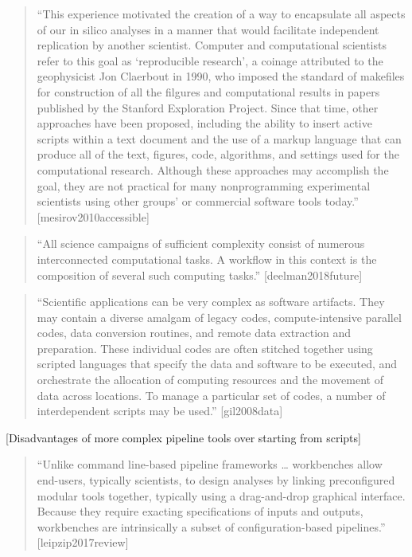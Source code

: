 \documentclass[]{tufte-book}
\begin{document}
\begin{quote}
``This experience motivated the creation of a way to encapsulate all aspects of
our in silico analyses in a manner that would facilitate independent replication
by another scientist. Computer and computational scientists refer to this goal as
`reproducible research', a coinage attributed to the geophysicist Jon Claerbout in 1990,
who imposed the standard of makefiles for construction of all the filgures and computational
results in papers published by the Stanford Exploration Project. Since that time, other
approaches have been proposed, including the ability to insert active scripts
within a text document and the use of a markup language that can produce
all of the text, figures, code, algorithms, and settings used for the computational
research. Although these approaches may accomplish the goal, they are not practical
for many nonprogramming experimental scientists using other groups' or commercial
software tools today.'' {[}mesirov2010accessible{]}
\end{quote}

\begin{quote}
``All science campaigns of sufficient complexity consist of numerous interconnected computational
tasks. A workflow in this context is the composition of several such computing
tasks.'' {[}deelman2018future{]}
\end{quote}

\begin{quote}
``Scientific applications can be very complex as software artifacts. They may contain
a diverse amalgam of legacy codes, compute-intensive parallel codes, data conversion routines, and remote
data extraction and preparation. These individual codes are often stitched
together using scripted languages that specify the data and software to be
executed, and orchestrate the allocation of computing resources and the
movement of data across locations. To manage a particular set of codes, a number
of interdependent scripts may be used.'' {[}gil2008data{]}
\end{quote}

{[}Disadvantages of more complex pipeline tools over starting from scripts{]}

\begin{quote}
``Unlike command line-based pipeline frameworks \ldots{} workbenches allow
end-users, typically scientists, to design analyses by linking preconfigured
modular tools together, typically using a drag-and-drop graphical interface.
Because they require exacting specifications of inputs and outputs,
workbenches are intrinsically a subset of configuration-based pipelines.''
{[}leipzip2017review{]}
\end{quote}
\end{document}
